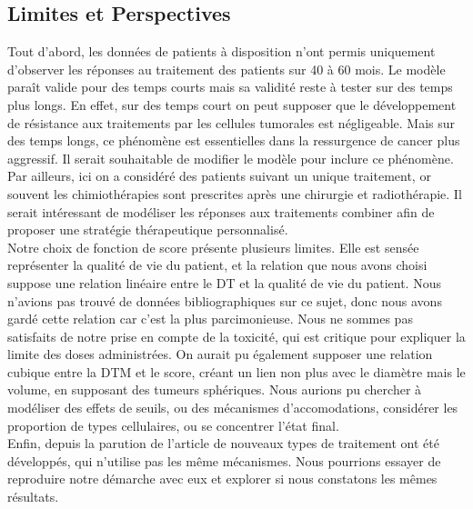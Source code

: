 \documentclass[12pt,a4paper]{article}
\begin{document}
\subsection{Limites et Perspectives}
Tout d'abord, les données de patients à disposition n'ont permis uniquement d'observer les réponses au traitement des patients sur 40 à 60 mois.  Le modèle paraît valide pour des temps courts mais sa validité reste à tester sur des temps plus longs. En effet, sur des temps court on peut supposer que le développement de résistance aux traitements par les cellules tumorales est négligeable. Mais sur des temps longs, ce phénomène est essentielles dans la ressurgence de cancer plus aggressif. Il serait souhaitable de modifier le modèle pour inclure ce phénomène. \\
Par ailleurs, ici on a considéré des patients suivant un unique traitement, or souvent les chimiothérapies sont prescrites après une chirurgie et radiothérapie. Il serait intéressant de modéliser les réponses aux traitements combiner afin de proposer une stratégie thérapeutique personnalisé.\\
Notre choix de fonction de score présente plusieurs limites. Elle est sensée représenter la qualité de vie du patient, et la relation que nous avons choisi suppose une relation linéaire entre le \ac{DT} et la qualité de vie du patient. Nous n'avions pas trouvé de données bibliographiques sur ce sujet, donc nous avons gardé cette relation car c'est la plus parcimonieuse. Nous ne sommes pas satisfaits de notre prise en compte de la toxicité, qui est critique pour expliquer la limite des doses administrées. On aurait pu également supposer une relation cubique entre la \ac{DTM} et le score, créant un lien non plus avec le diamètre mais le volume, en supposant des tumeurs sphériques. Nous aurions pu chercher à modéliser des effets de seuils, ou des mécanismes d'accomodations, considérer les proportion de types cellulaires, ou se concentrer l'état final.\\
Enfin, depuis la parution de l'article de nouveaux types de traitement ont été développés, qui n'utilise pas les même mécanismes. Nous pourrions essayer de reproduire notre démarche avec eux et explorer si nous constatons les mêmes résultats. 
\end{document}
